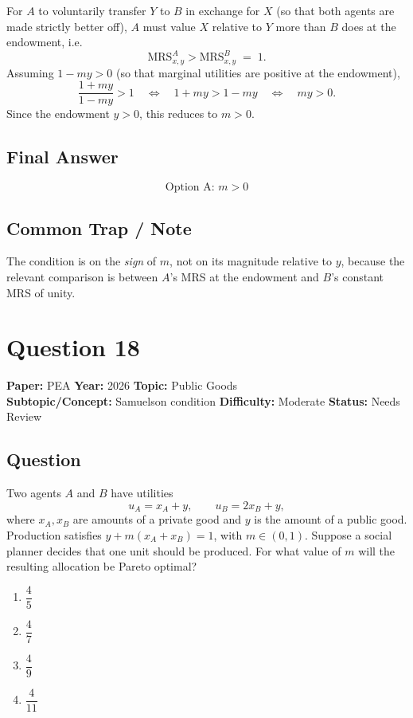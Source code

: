 \documentclass[11pt]{article}
\begin{document}
For $A$ to voluntarily transfer $Y$ to $B$ in exchange for $X$ (so that both
agents are made strictly better off), $A$ must value $X$ relative to $Y$ more
than $B$ does at the endowment, i.e.
\[
\text{MRS}^A_{x,y} > \text{MRS}^B_{x,y} \;=\; 1.
\]
Assuming $1 - my > 0$ (so that marginal utilities are positive at the endowment),
\[
\frac{1+my}{1-my} > 1 \quad\Longleftrightarrow\quad 1 + my > 1 - my
\quad\Longleftrightarrow\quad my > 0.
\]
Since the endowment $y > 0$, this reduces to $m > 0$.

\subsection*{Final Answer}
\[
\boxed{\text{Option A: } m > 0}
\]

\subsection*{Common Trap / Note}
The condition is on the \emph{sign} of $m$, not on its magnitude relative to $y$,
because the relevant comparison is between $A$'s MRS at the endowment and $B$'s
constant MRS of unity.

\section*{Question 18}
\textbf{Paper:} PEA \quad \textbf{Year:} 2026 \quad \textbf{Topic:} Public Goods \\
\textbf{Subtopic/Concept:} Samuelson condition \quad
\textbf{Difficulty:} Moderate \quad \textbf{Status:} Needs Review

\subsection*{Question}
Two agents $A$ and $B$ have utilities
\[
u_A = x_A + y, \qquad u_B = 2x_B + y,
\]
where $x_A, x_B$ are amounts of a private good and $y$ is the amount of a public
good. Production satisfies $y + m(x_A + x_B) = 1$, with $m \in (0,1)$. Suppose a
social planner decides that one unit should be produced. For what value of $m$
will the resulting allocation be Pareto optimal?
\begin{enumerate}[label=(\Alph*)]
\item $\dfrac{4}{5}$ \item $\dfrac{4}{7}$ \item $\dfrac{4}{9}$ \item $\dfrac{4}{11}$
\end{enumerate}
\end{document}

